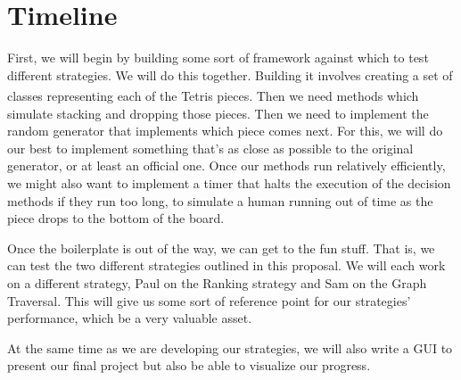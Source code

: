 \documentclass{article}
\def\tetris{Tetris\textsuperscript{\textregistered}}
\begin{document}
\section{Timeline}

\par First, we will begin by building some sort of framework against which to test different strategies. We will do this together. Building it involves creating a set of classes representing each of the \tetris{} pieces. Then we need methods which simulate stacking and dropping those pieces. Then we need to implement the random generator that implements which piece comes next. For this, we will do our best to implement something that's as close as possible to the original generator, or at least an official one. Once our methods run relatively efficiently, we might also want to implement a timer that halts the execution of the decision methods if they run too long, to simulate a human running out of time as the piece drops to the bottom of the board.

\par Once the boilerplate is out of the way, we can get to the fun stuff. That is, we can test the two different strategies outlined in this proposal. We will each work on a different strategy, Paul on the Ranking strategy and Sam on the Graph Traversal. This will give us some sort of reference point for our strategies' performance, which be a very valuable asset.

\par At the same time as we are developing our strategies, we will also write a GUI to present our final project but also be able to visualize our progress.
\end{document}
